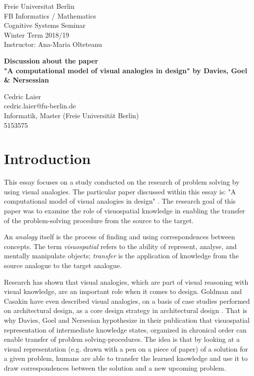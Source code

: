 \documentclass[12pt]{article}
\begin{document}
\noindent
Freie Universitat Berlin\\
FB Informatics / Mathematics\\
Cognitive Systems Seminar\\
Winter Term 2018/19\\
Instructor: Ana-Maria Olteteanu
\vspace{5cm}
\begin{center}
{\LARGE \textbf{Discussion about the paper \\"A computational model of visual analogies in design" by Davies, Goel \& Nersessian}}
\end{center}
\vspace{6,5cm}

\noindent
Cedric Laier \\
cedric.laier@fu-berlin.de\\
Informatik, Master (Freie Universität Berlin) \\
5153575 \\
\clearpage


\section{Introduction}

\noindent This essay focuses on a study conducted on the research of problem solving by using visual analogies. The particular paper discussed within this essay is: "A computational model of visual analogies in design" \cite{davies2009computational}. The research goal of this paper was to examine the role of visuospatial knowledge in enabling the transfer of the problem-solving procedure from the source to the target.

An \textit{analogy} itself is the process of finding and using correspondences between concepts. The term \textit{visuospatial} refers to the ability of represent, analyse, and mentally manipulate objects; \textit{transfer} is the application of knowledge from the source analogue to the target analogue.

Research has shown that visual analogies, which are part of visual reasoning with visual knowledge, are an important role when it comes to design. Goldman and Casakin have even described visual analogies, on a basis of case studies performed on architectural design, as a core design strategy in architectural design \cite{casakin1999expertise}. That is why Davies, Goel and Nersesian hypothesize in their publication that visuospatial representation of intermediate knowledge states, organized in chronical order can enable transfer of problem solving-procedures. The idea is that by looking at a visual representation (e.g. drawn with a pen on a piece of paper) of a solution for a given problem, humans are able to transfer the learned knowledge and use it to draw correspondences between the solution and a new upcoming problem. 
\end{document}
